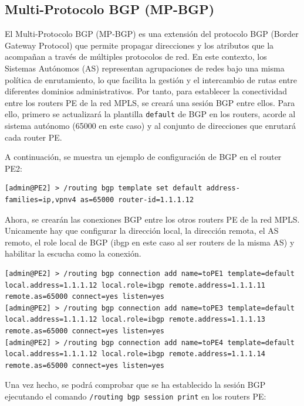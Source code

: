 \subsection{Multi-Protocolo BGP (MP-BGP)}
El Multi-Protocolo BGP (MP-BGP) es una extensión del protocolo BGP (Border Gateway Protocol) que permite propagar direcciones y los atributos que la acompañan a través de múltiples protocolos de red. En este contexto, los Sistemas Autónomos (AS) representan agrupaciones de redes bajo una misma política de enrutamiento, lo que facilita la gestión y el intercambio de rutas entre diferentes dominios administrativos. Por tanto, para establecer la conectividad entre los routers PE de la red MPLS, se creará una sesión BGP entre ellos. Para ello, primero se actualizará la plantilla \texttt{default} de BGP en los routers, acorde al sistema autónomo (65000 en este caso) y al conjunto de direcciones que enrutará cada router PE.

\vspace{0.5cm}
\noindent
A continuación, se muestra un ejemplo de configuración de BGP en el router PE2:
\begin{lstlisting}[language=RouterOS]
[admin@PE2] > /routing bgp template set default address-families=ip,vpnv4 as=65000 router-id=1.1.1.12
\end{lstlisting}

Ahora, se crearán las conexiones BGP entre los otros routers PE de la red MPLS. Unicamente hay que configurar la dirección local, la dirección remota, el AS remoto, el role local de BGP (ibgp en este caso al ser routers de la misma AS) y habilitar la escucha como la conexión.
\begin{lstlisting}[language=RouterOS]
[admin@PE2] > /routing bgp connection add name=toPE1 template=default local.address=1.1.1.12 local.role=ibgp remote.address=1.1.1.11 remote.as=65000 connect=yes listen=yes
[admin@PE2] > /routing bgp connection add name=toPE3 template=default local.address=1.1.1.12 local.role=ibgp remote.address=1.1.1.13 remote.as=65000 connect=yes listen=yes
[admin@PE2] > /routing bgp connection add name=toPE4 template=default local.address=1.1.1.12 local.role=ibgp remote.address=1.1.1.14 remote.as=65000 connect=yes listen=yes
\end{lstlisting}

Una vez hecho, se podrá comprobar que se ha establecido la sesión BGP ejecutando el comando \lstinline[language=RouterOS]|/routing bgp session print| en los routers PE:

